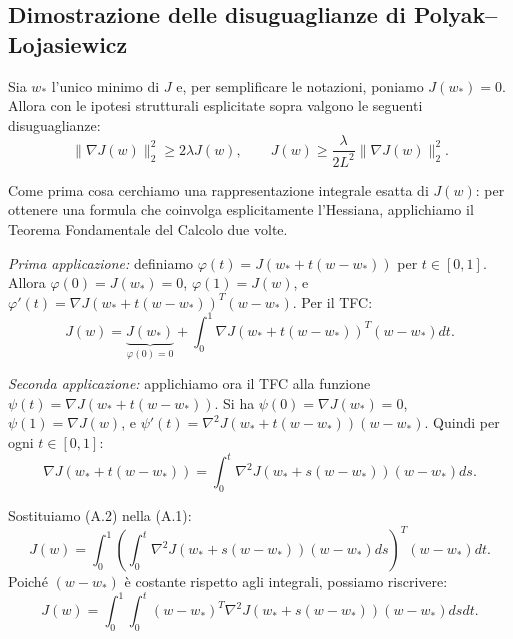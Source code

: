 \documentclass[a4paper,12pt]{article}
\begin{document}
\subsection{Dimostrazione delle disuguaglianze di \newline Polyak--Lojasiewicz}

Sia $w_*$ l'unico minimo di $J$ e, per semplificare le notazioni, poniamo $J(w_*) = 0$. Allora con le ipotesi strutturali esplicitate sopra valgono le seguenti disuguaglianze:
\[
\|\nabla J(w)\|_2^2 \geq 2\lambda J(w), \qquad J(w) \geq \frac{\lambda}{2L^2} \|\nabla J(w)\|_2^2.
\]

Come prima cosa cerchiamo una rappresentazione integrale esatta di $J(w)$: per ottenere una formula che coinvolga esplicitamente l'Hessiana, applichiamo il Teorema Fondamentale del Calcolo due volte.

\textit{Prima applicazione:} definiamo $\varphi(t) = J(w_* + t(w - w_*))$ per $t \in [0, 1]$. Allora $\varphi(0) = J(w_*) = 0$, $\varphi(1) = J(w)$, e $\varphi'(t) = \nabla J(w_* + t(w - w_*))^T (w - w_*)$. Per il TFC:
\[
J(w) = \underbrace{J(w_*)}_{\varphi(0)=0} + \int_0^1 \nabla J(w_* + t(w - w_*))^T (w - w_*) dt. \tag{A.1}
\]

\textit{Seconda applicazione:} applichiamo ora il TFC alla funzione $\psi(t) = \nabla J(w_* + t(w - w_*))$. Si ha $\psi(0) = \nabla J(w_*) = 0$, $\psi(1) = \nabla J(w)$, e $\psi'(t) = \nabla^2 J(w_* + t(w - w_*))(w - w_*)$. Quindi per ogni $t \in [0, 1]$:
\[
\nabla J(w_* + t(w - w_*)) = \int_0^t \nabla^2 J(w_* + s(w - w_*))(w - w_*) ds. \tag{A.2}
\]

Sostituiamo (A.2) nella (A.1):
\[
J(w) = \int_0^1 \left( \int_0^t \nabla^2 J(w_* + s(w - w_*))(w - w_*) ds \right)^T (w - w_*) dt.
\]
Poiché $(w - w_*)$ è costante rispetto agli integrali, possiamo riscrivere:
\[
J(w) = \int_0^1 \int_0^t (w - w_*)^T \nabla^2 J(w_* + s(w - w_*))(w - w_*) ds dt.
\]
\end{document}
